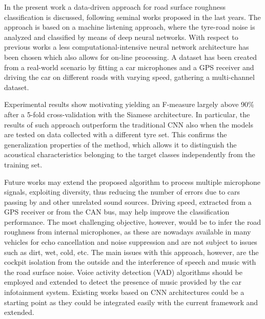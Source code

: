 In the present work a data-driven approach for road surface roughness classification is discussed, following seminal works proposed in the last years. The approach is based on a machine listening approach, where the tyre-road noise is analyzed and classified by means of deep neural networks. With respect to previous works a less computational-intensive neural network architecture has been chosen which also allows for on-line processing. A dataset has been created from a real-world scenario by fitting a car microphones and a GPS receiver and driving the car on different roads with varying speed, gathering a multi-channel dataset. 


Experimental results show motivating yielding an F-measure largely above 90\% after a 5-fold cross-validation with the Siamese architecture. In particular, the results of such approach outperform the traditional CNN also when the models are tested on data collected with a different tyre set. This confirms the generalization properties of the method, which allows it to distinguish the acoustical characteristics belonging to the target classes independently from the training set.


Future works may extend the proposed algorithm to process multiple microphone signals, exploiting diversity, thus reducing the number of errors due to cars passing by and other unrelated sound sources. Driving speed, extracted from a GPS receiver or from the CAN bus, may help improve the classification performance. The most challenging objective, however, would be to infer the road roughness from internal microphones, as these are nowadays available in many vehicles for echo cancellation and noise suppression and are not subject to issues such as dirt, wet, cold, etc. The main issues with this approach, however, are the cockpit isolation from the outside and the interference of speech and music with the road surface noise. Voice activity detection (VAD) \cite{Ephraim:1984,ghosh2011robust} algorithms should be employed and extended to detect the presence of music provided by the car infotainment system. Existing works based on CNN architectures \cite{wirn2016-vad,ijcnn2016-vad} could be a starting point as they could be integrated easily with the current framework and extended.


